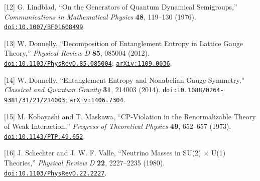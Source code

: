 \documentclass[
  11pt,
  a4paper,
]{article}
\begin{document}
{[}12{]} G. Lindblad, ``On the Generators of Quantum Dynamical Semigroups,'' \emph{Communications in Mathematical Physics} \textbf{48}, 119--130 (1976). \href{https://doi.org/10.1007/BF01608499}{\nolinkurl{doi:10.1007/BF01608499}}.

{[}13{]} W. Donnelly, ``Decomposition of Entanglement Entropy in Lattice Gauge Theory,'' \emph{Physical Review D} \textbf{85}, 085004 (2012). \href{https://doi.org/10.1103/PhysRevD.85.085004}{\nolinkurl{doi:10.1103/PhysRevD.85.085004}}; \href{https://arxiv.org/abs/1109.0036}{\nolinkurl{arXiv:1109.0036}}.

{[}14{]} W. Donnelly, ``Entanglement Entropy and Nonabelian Gauge Symmetry,'' \emph{Classical and Quantum Gravity} \textbf{31}, 214003 (2014). \href{https://doi.org/10.1088/0264-9381/31/21/214003}{\nolinkurl{doi:10.1088/0264-9381/31/21/214003}}; \href{https://arxiv.org/abs/1406.7304}{\nolinkurl{arXiv:1406.7304}}.

{[}15{]} M. Kobayashi and T. Maskawa, ``CP-Violation in the Renormalizable Theory of Weak Interaction,'' \emph{Progress of Theoretical Physics} \textbf{49}, 652--657 (1973). \href{https://doi.org/10.1143/PTP.49.652}{\nolinkurl{doi:10.1143/PTP.49.652}}.

{[}16{]} J. Schechter and J. W. F. Valle, ``Neutrino Masses in SU(2) × U(1) Theories,'' \emph{Physical Review D} \textbf{22}, 2227--2235 (1980). \href{https://doi.org/10.1103/PhysRevD.22.2227}{\nolinkurl{doi:10.1103/PhysRevD.22.2227}}.
\end{document}
